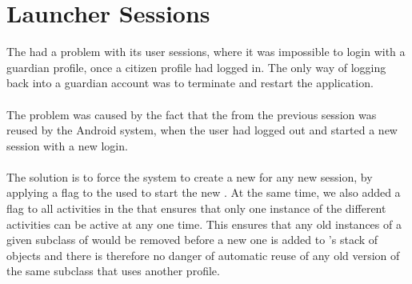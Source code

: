 
\section{Launcher Sessions}
\label{sec:launcher_session_issues}

The \launcher had a problem with its user sessions, where it was impossible to login with a guardian profile, once a citizen profile had logged in. The only way of logging back into a guardian account was to terminate and restart the application.
\\\\
The problem was caused by the fact that the  from the previous session was reused by the Android system, when the user had logged out and started a new session with a new login.
\\\\
The solution is to force the system to create a new  for any new session, by applying a flag to the  used to start the new . At the same time, we also added a flag to all activities in the \launcher that ensures that only one instance of the different activities can be active at any one time. This ensures that any old instances of a given subclass of  would be removed before a new one is added to \launcher's stack of  objects and there is therefore no danger of automatic reuse of any old version of the same  subclass that uses another profile. 